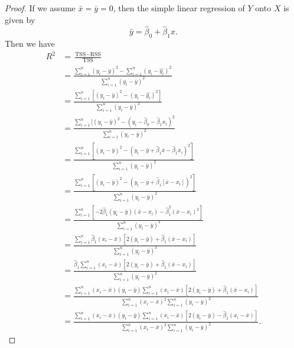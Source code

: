 
\begin{proof}
    If we assume $\bar{x} = \bar{y} = 0$, then the simple linear regression of
    $Y$ onto $X$ is given by
    \[
        \hat{y} = \hat{\beta}_0 + \hat{\beta}_1 x.
    \]
    Then we have
    \begin{equation*}
        \begin{split}
            R^2 &= \frac{\text{TSS} - \text{RSS}}{\text{TSS}} \\
                &= \frac{\sum_{i=1}^{n}{(y_i - \bar{y})}^{2} 
                    - \sum_{i=1}^{n}{(y_i - \hat{y_i})}^{2}}
                    {\sum_{i=1}^{n}{(y_i - \bar{y})}^{2}} \\
                &= \frac{\sum_{i=1}^{n}[{(y_i - \bar{y})}^{2} 
                    - {(y_i - \hat{y_i})}^{2}]}
                    {\sum_{i=1}^{n}{(y_i - \bar{y})}^{2}} \\
                &= \frac{\sum_{i=1}^{n}[{(y_i - \bar{y})}^{2} 
                    - {(y_i - \hat{\beta}_0 - \hat{\beta}_1 x_i)}^{2}}
                    {\sum_{i=1}^{n}{(y_i - \bar{y})}^{2}} \\
                &= \frac{\sum_{i=1}^{n}[{(y_i - \bar{y})}^{2} 
                    - {(y_i - \bar{y} + \hat{\beta}_1 \bar{x} 
                    - \hat{\beta}_1 x_i)}^{2}]}
                    {\sum_{i=1}^{n}{(y_i - \bar{y})}^{2}} \\
                &= \frac{\sum_{i=1}^{n}[{(y_i - \bar{y})}^{2} 
                    - {(y_i - \bar{y} + \hat{\beta}_1 [\bar{x} - x_i])}^{2}]}
                    {\sum_{i=1}^{n}{(y_i - \bar{y})}^{2}} \\
                &= \frac{\sum_{i=1}^{n}[-2\hat{\beta}_1(y_i - \bar{y})(\bar{x} - x_i)
                - \hat{\beta}_1^2{(\bar{x} - x_i)}^{2}]}
                    {\sum_{i=1}^{n}{(y_i - \bar{y})}^{2}} \\
                &= \frac{\sum_{i=1}^{n}\hat{\beta}_1(x_i - \bar{x})
                    [2(y_i - \bar{y}) + \hat{\beta}_1(\bar{x} - x_i)]}
                    {\sum_{i=1}^{n}{(y_i - \bar{y})}^{2}} \\
                &= \frac{\hat{\beta}_1\sum_{i=1}^{n}(x_i - \bar{x})
                    [2(y_i - \bar{y}) + \hat{\beta}_1(\bar{x} - x_i)]}
                    {\sum_{i=1}^{n}{(y_i - \bar{y})}^{2}} \\
                &= \frac{\sum_{i=1}^{n}(x_i - \bar{x})(y_i - \bar{y})
                        \sum_{i=1}^{n}(x_i - \bar{x})[2(y_i - \bar{y}) 
                        + \hat{\beta}_1(\bar{x} - x_i)]}
                    {\sum_{i=1}^{n}{(x_i - \bar{x})}^{2}\sum_{i=1}^{n}{(y_i - \bar{y})}^{2}} \\
                &= \frac{\sum_{i=1}^{n}(x_i - \bar{x})(y_i - \bar{y})
                        \sum_{i=1}^{n}(x_i - \bar{x})[2(y_i - \bar{y}) 
                        - \hat{\beta}_1(x_i - \bar{x})]}
                    {\sum_{i=1}^{n}{(x_i - \bar{x})}^{2}\sum_{i=1}^{n}{(y_i - \bar{y})}^{2}}.
        \end{split}
    \end{equation*}


\end{proof}
